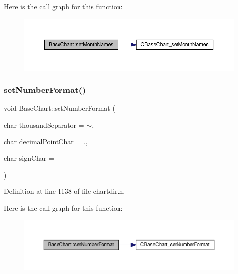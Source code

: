 Here is the call graph for this function\+:
\nopagebreak
\begin{figure}[H]
\begin{center}
\leavevmode
\includegraphics[width=350pt]{class_base_chart_ab4eb2087f764057db74611a6fdc1fab7_cgraph}
\end{center}
\end{figure}
\mbox{\label{class_base_chart_ae9a84d62ae1bf380296976bba8cd98c9}} 
\subsubsection{\texorpdfstring{set\+Number\+Format()}{setNumberFormat()}}
{\footnotesize\ttfamily void Base\+Chart\+::set\+Number\+Format (\begin{DoxyParamCaption}\item[{char}]{thousand\+Separator = {\ttfamily \textquotesingle{}$\sim$\textquotesingle{}},  }\item[{char}]{decimal\+Point\+Char = {\ttfamily \textquotesingle{}.\textquotesingle{}},  }\item[{char}]{sign\+Char = {\ttfamily \textquotesingle{}-\/\textquotesingle{}} }\end{DoxyParamCaption})\hspace{0.3cm}{\ttfamily [inline]}}



Definition at line 1138 of file chartdir.\+h.

Here is the call graph for this function\+:
\nopagebreak
\begin{figure}[H]
\begin{center}
\leavevmode
\includegraphics[width=350pt]{class_base_chart_ae9a84d62ae1bf380296976bba8cd98c9_cgraph}
\end{center}
\end{figure}
\mbox{\label{class_base_chart_a486db479183dceab6fe3ff27570fc249}} 
